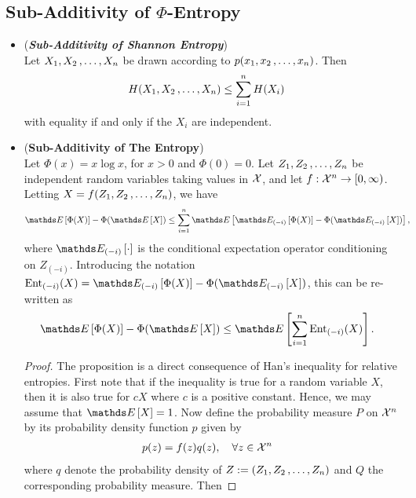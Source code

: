 \documentclass[11pt]{article}
\begin{document}
\subsection{Sub-Additivity of $\Phi$-Entropy}
\begin{itemize}
\item \begin{remark}(\emph{\textbf{Sub-Additivity of Shannon Entropy}})\\
Let $X_1, X_2 \,{,}\ldots{,}\, X_n$ be drawn according to $p(x_1, x_2 \,{,}\ldots{,}\, x_n)$. Then
\begin{align*}
H(X_1, X_2 \,{,}\ldots{,}\, X_n) &\le \sum_{i=1}^{n}H(X_i)  
\end{align*} with equality if and only if the $X_i$ are independent.
\end{remark}

\item \begin{proposition} (\textbf{Sub-Additivity of The Entropy}) \citep{boucheron2013concentration}\\
Let $\Phi(x) = x\log x$,  for $x >0$ and $\Phi(0) = 0$. Let $Z_1, Z_2 \,{,}\ldots{,}\, Z_n$ be independent random variables taking values in ${\mathcal X}$, and let $f: {\mathcal X}^n \to [0, \infty)$. Letting $X = f(Z_1, Z_2 \,{,}\ldots{,}\, Z_n)$, we have 
\begin{align}
\E{}{\Phi(X)} - \Phi(\E{}{X}) &\le \sum_{i=1}^{n}\E{}{\E{(-i)}{\Phi(X)} - \Phi(\E{(-i)}{X})}, \label{ineqn: sub_additivity_phi_entropy}
\end{align} where $\E{(-i)}{\cdot}$ is the conditional expectation operator conditioning on $Z_{(-i)}$. Introducing the notation $\text{Ent}_{(-i)}(X) = \E{(-i)}{\Phi(X)} - \Phi(\E{(-i)}{X})$, this can be re-written as
\begin{align}
\E{}{\Phi(X)} - \Phi(\E{}{X}) &\le \E{}{\sum_{i=1}^{n} \text{Ent}_{(-i)}(X)}. \label{ineqn: sub_additivity_phi_entropy_2}
\end{align}
\end{proposition}
\begin{proof}
The proposition is a direct consequence of Han's inequality for relative entropies. First note that if the inequality is true for a random variable $X$, then it is also true for $cX$ where $c$ is a positive constant. Hence, we may assume that $\E{}{X} = 1$. Now define the probability measure $P$ on ${\mathcal X}^n$ by its probability density function $p$ given by
\begin{align*}
p(z) &= f(z) q(z), \quad \forall z \in {\mathcal X}^n
\end{align*} where $q$ denote the probability density of $Z:= (Z_1, Z_2 \,{,}\ldots{,}\, Z_n)$ and $Q$ the corresponding probability measure. Then 

\end{proof}
\end{itemize}
\end{document}
